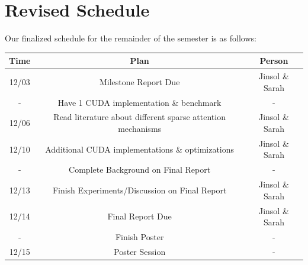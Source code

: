 \documentclass[11pt]{article}
\begin{document}
\section{Revised Schedule}
\label{sec:revised-schedule}
Our finalized schedule for the remainder of the semester is as follows:
\begin{center}
\begin{tabular}{ |c|c|c| } 
 \hline
 Time & Plan & Person\\ 
 \hline
 12/03 & Milestone Report Due  & Jinsol \& Sarah\\ 
 - & Have 1 CUDA implementation \& benchmark & - \\
 12/06 & Read literature about different sparse attention mechanisms & Jinsol \& Sarah\\ 
 12/10 & Additional CUDA implementations \& optimizations & Jinsol \& Sarah\\
 - & Complete Background on Final Report  & - \\
 12/13 & Finish Experiments/Discussion on Final Report & Jinsol \& Sarah\\
 12/14 & Final Report Due & Jinsol \& Sarah\\ 
 - & Finish Poster  & - \\
 12/15 & Poster Session  & - \\
 \hline
\end{tabular}
\end{center}



\end{document}
